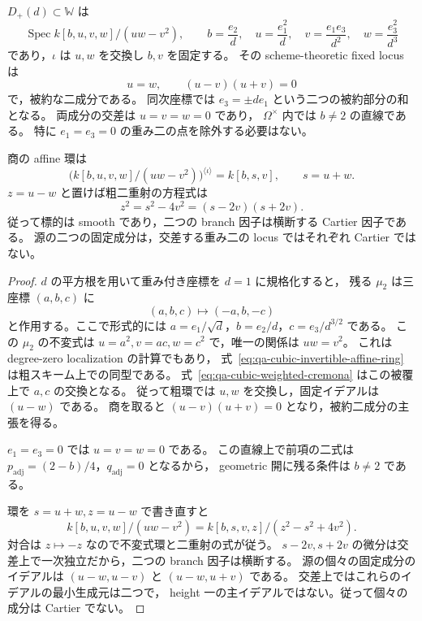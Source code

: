 \begin{proposition}[可逆cubic領域の粗環と固定部分]
\label{prop:qa-cubic-inversion-weight-two-fixed-locus}
$D_+(d)\subset\mathbb W$ は
\[
 \operatorname{Spec}
 k[b,u,v,w]/(uw-v^2),
 \qquad
 b=\frac{e_2}{d},\quad
 u=\frac{e_1^2}{d},\quad
 v=\frac{e_1e_3}{d^2},\quad
 w=\frac{e_3^2}{d^3}
 \tag{AC}\label{eq:qa-cubic-invertible-affine-ring}
\]
であり，$\iota$ は $u,w$ を交換し $b,v$ を固定する。
その scheme-theoretic fixed locus は
\[
 u=w,\qquad (u-v)(u+v)=0
\]
で，被約な二成分である。
同次座標では $e_3=\pm de_1$ という二つの被約部分の和となる。
両成分の交差は $u=v=w=0$ であり，
$\Omega^\times$ 内では $b\ne2$ の直線である。
特に $e_1=e_3=0$ の重み二の点を除外する必要はない。

商の affine 環は
\[
 \bigl(k[b,u,v,w]/(uw-v^2)\bigr)^{\langle\iota\rangle}
       =k[b,s,v],\qquad s=u+w.
\]
$z=u-w$ と置けば粗二重射の方程式は
\[
 z^2=s^2-4v^2=(s-2v)(s+2v).
 \tag{DB}\label{eq:qa-cubic-inversion-double-cover}
\]
従って標的は smooth であり，二つの branch 因子は横断する Cartier 因子である。
源の二つの固定成分は，交差する重み二の locus ではそれぞれ Cartier ではない。
\end{proposition}
\begin{proof}
$d$ の平方根を用いて重み付き座標を $d=1$ に規格化すると，
残る $\mu_2$ は三座標 $(a,b,c)$ に
\[
 (a,b,c)\longmapsto(-a,b,-c)
\]
と作用する。ここで形式的には
$a=e_1/\sqrt d$，$b=e_2/d$，$c=e_3/d^{3/2}$ である。
この $\mu_2$ の不変式は $u=a^2,v=ac,w=c^2$ で，唯一の関係は $uw=v^2$。
これは degree-zero localization の計算でもあり，
式~\eqref{eq:qa-cubic-invertible-affine-ring} は粗スキーム上での同型である。
式~\eqref{eq:qa-cubic-weighted-cremona} はこの被覆上で $a,c$ の交換となる。
従って粗環では $u,w$ を交換し，固定イデアルは $(u-w)$ である。
商を取ると $(u-v)(u+v)=0$ となり，被約二成分の主張を得る。

$e_1=e_3=0$ では $u=v=w=0$ である。
この直線上で前項の二式は
$p_{\mathrm{adj}}=(2-b)/4$，$q_{\mathrm{adj}}=0$ となるから，
geometric 開に残る条件は $b\ne2$ である。

環を $s=u+w,z=u-w$ で書き直すと
\[
 k[b,u,v,w]/(uw-v^2)
   =k[b,s,v,z]/(z^2-s^2+4v^2).
\]
対合は $z\mapsto-z$ なので不変式環と二重射の式が従う。
$s-2v,s+2v$ の微分は交差上で一次独立だから，二つの branch 因子は横断する。
源の個々の固定成分のイデアルは
$(u-w,u-v)$ と $(u-w,u+v)$ である。
交差上ではこれらのイデアルの最小生成元は二つで，
height 一の主イデアルではない。従って個々の成分は Cartier でない。
\end{proof}

